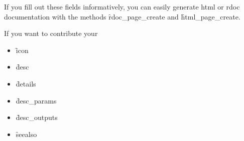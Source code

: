 If you fill out these fields informatively, you can easily generate html or rdoc documentation with the methods \f{rdoc_page_create} and \f{html_page_create}.

If you want to contribute your

\begin{itemize}
  \item \f{icon}
  \item \f{desc}
  \item \f{details}
  \item \f{desc_params}
  \item \f{desc_outputs}
  \item \f{seealso}
\end{itemize}


